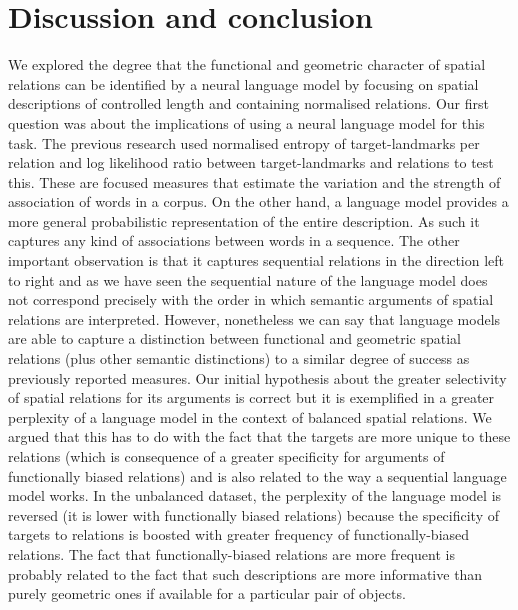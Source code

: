 \section{Discussion and conclusion}
\label{splu2018:sec:discussion}


We explored the degree that the functional and geometric character of
spatial relations can be identified by a neural language model by
focusing on spatial descriptions of controlled length and containing
normalised relations. Our first question was about the implications of
using a neural language model for this task. The previous research
\cite{Dobnik:2013aa} used normalised entropy of target-landmarks per
relation and log likelihood ratio between target-landmarks and
relations to test this. These are focused measures that estimate the
variation and the strength of association of words in a corpus. On the
other hand, a language model provides a more general probabilistic
representation of the entire description. As such it captures any kind
of associations between words in a sequence. The other important
observation is that it captures sequential relations in the direction
left to right and as we have seen the sequential nature of the
language model does not correspond precisely with the order in which
semantic arguments of spatial relations are interpreted. However,
nonetheless we can say that language models are able to capture a
distinction between functional and geometric spatial relations (plus
other semantic distinctions) to a similar degree of success as
previously reported measures. Our initial hypothesis about the greater
selectivity of spatial relations for its arguments is correct but it
is exemplified in a greater perplexity of a language model in the
context of balanced spatial relations. We argued that this has to do
with the fact that the targets are more unique to these relations
(which is consequence of a greater specificity for arguments of
functionally biased relations) and is also related to the way a
sequential language model works. In the unbalanced dataset, the
perplexity of the language model is reversed (it is lower with
functionally biased relations) because the specificity of targets to
relations is boosted with greater frequency of functionally-biased
relations. The fact that functionally-biased relations are more
frequent is probably related to the fact that such descriptions are
more informative than purely geometric ones if available for a
particular pair of objects.

